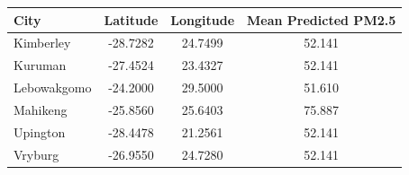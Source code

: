 \begin{tabular}{lccc}
\toprule
City & Latitude & Longitude & Mean Predicted PM2.5 \\ \midrule
Kimberley & -28.7282 & 24.7499 & 52.141 \\
Kuruman & -27.4524 & 23.4327 & 52.141 \\
Lebowakgomo & -24.2000 & 29.5000 & 51.610 \\
Mahikeng & -25.8560 & 25.6403 & 75.887 \\
Upington & -28.4478 & 21.2561 & 52.141 \\
Vryburg & -26.9550 & 24.7280 & 52.141 \\
\bottomrule
\end{tabular}
